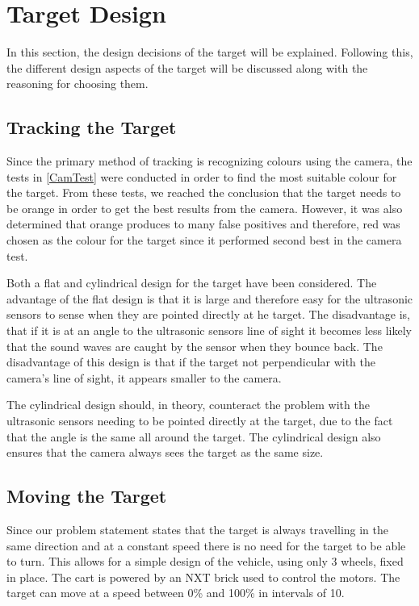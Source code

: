 \section{Target Design}\label{targetDesign}
In this section, the design decisions of the target will be explained.
Following this, the different design aspects of the target will be
discussed along with the reasoning for choosing them.

\subsection{Tracking the Target}
Since the primary method of tracking is recognizing colours using the camera,
the tests in \autoref{CamTest} were conducted in order to find the most suitable
colour for the target. From these tests, we reached the conclusion that the
target needs to be orange in order to get the best results from the camera.
However, it was also determined that orange produces to many false positives and therefore,
red was chosen as the colour for the target since it performed second best in
the camera test.
\nl

Both a flat and cylindrical design for the target have been considered. The
advantage of the flat design is that it is large and therefore easy for the ultrasonic
sensors to sense when they are pointed directly at he target. The disadvantage
is, that if it is at an angle to the ultrasonic sensors line of sight it
becomes less likely that the sound waves are caught by the sensor when they
bounce back. The disadvantage of this design is that if the target not
perpendicular with the camera's line of sight, it appears smaller to
the camera.\nl

The cylindrical design should, in theory, counteract the problem with the
ultrasonic sensors needing to be pointed directly at the target, due to the
fact that the angle is the same all around the target. The cylindrical design
also ensures that the camera always sees the target as the same size.\nl

\subsection{Moving the Target}
Since our problem statement states that the target is always travelling in the
same direction and at a constant speed there is no need for the target to be
able to turn. This allows for a simple design of the vehicle, using only 3
wheels, fixed in place. The cart is powered by an NXT brick used to control the
motors. The target can move at a speed between 0\% and 100\% in intervals of
10.
\nl

